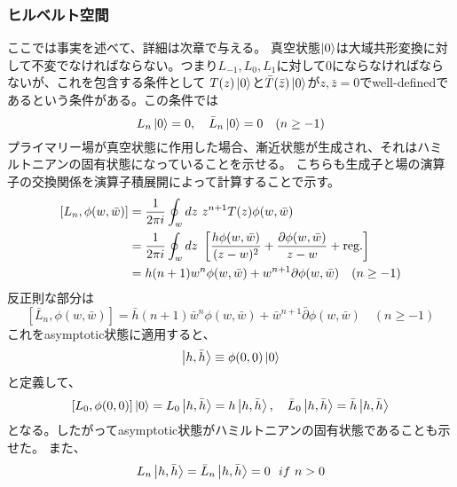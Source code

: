 \documentclass[11pt, aps, longbibliography]{article}
\numberwithin{equation}{section}
\begin{document}
    \subsubsection{ヒルベルト空間}
        ここでは事実を述べて、詳細は次章で与える。
        真空状態$\ket{0}$は大域共形変換に対して不変でなければならない。つまり$L_{-1},L_{0}, L_1$に対して0にならなければならないが、これを包含する条件として
        $T(z)\ket{0}$と$\bar{T}(\bar{z})\ket{0}$が$z,\bar{z}=0$でwell-definedであるという条件がある。この条件では
        \begin{equation}\label{eq:virasoro8}
            L_n \ket{0} = 0, \quad \bar{L}_n\ket{0} = 0 \quad (n \geq -1)
        \end{equation}
        プライマリー場が真空状態に作用した場合、漸近状態が生成され、それはハミルトニアンの固有状態になっていることを示せる。
        こちらも生成子と場の演算子の交換関係を演算子積展開によって計算することで示す。
        \begin{align}\label{eq:virasoro9}
            [L_n, \phi(w,\bar{w})] &= \frac{1}{2\pi i}\oint_w dz \ z^{n+1}T(z)\phi(w,\bar{w}) \notag \\
            &= \frac{1}{2\pi i}\oint_w dz \ \left[ \frac{h\phi(w,\bar{w})}{(z-w)^2} + \frac{\partial\phi(w,\bar{w})}{z-w} + \text{reg.} \right] \notag \\
            &= h(n+1)w^n \phi(w,\bar{w}) + w^{n+1}\partial \phi(w,\bar{w}) \quad (n \geq -1)
        \end{align}
        反正則な部分は
        \begin{equation}\label{eq:virasoro10}
            [\bar{L}_n, \phi(w,\bar{w})] = \bar{h}(n+1)\bar{w}^n \phi(w,\bar{w}) + \bar{w}^{n+1}\bar{\partial}\phi(w,\bar{w})\quad (n \geq -1)
        \end{equation}
        これをasymptotic状態に適用すると、
        \begin{equation}\label{eq:virasoro11}
            \ket{h,\bar{h}} \equiv \phi(0, 0)\ket{0}
        \end{equation}
        と定義して、
        \begin{equation}\label{eq:virasoro12}
            [L_0, \phi(0,0)]\ket{0} = L_0\ket{h,\bar{h}} = h\ket{h,\bar{h}}, \quad \bar{L}_0\ket{h,\bar{h}} = \bar{h}\ket{h,\bar{h}}
        \end{equation}
        となる。したがってasymptotic状態がハミルトニアンの固有状態であることも示せた。
        また、
        \begin{equation}\label{eq:virasoro13}
            L_n\ket{h,\bar{h}} = \bar{L}_n\ket{h,\bar{h}} = 0 \ \  if \ n>0
        \end{equation}
\end{document}
